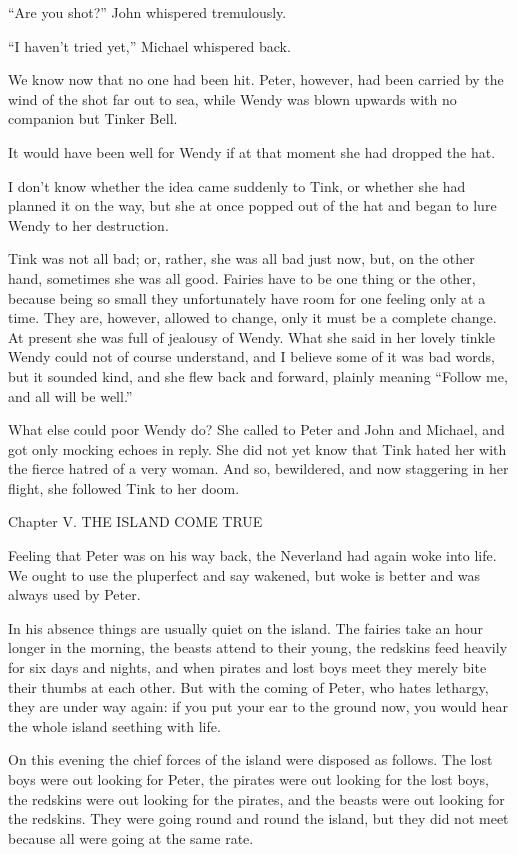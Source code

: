 ``Are you shot?'' John whispered tremulously.

``I haven't tried yet,'' Michael whispered back.

We know now that no one had been hit. Peter, however, had been carried
by the wind of the shot far out to sea, while Wendy was blown upwards
with no companion but Tinker Bell.

It would have been well for Wendy if at that moment she had dropped the
hat.

I don't know whether the idea came suddenly to Tink, or whether she had
planned it on the way, but she at once popped out of the hat and began
to lure Wendy to her destruction.

Tink was not all bad; or, rather, she was all bad just now, but, on the
other hand, sometimes she was all good. Fairies have to be one thing or
the other, because being so small they unfortunately have room for one
feeling only at a time. They are, however, allowed to change, only it
must be a complete change. At present she was full of jealousy of
Wendy. What she said in her lovely tinkle Wendy could not of course
understand, and I believe some of it was bad words, but it sounded
kind, and she flew back and forward, plainly meaning ``Follow me, and
all will be well.''

What else could poor Wendy do? She called to Peter and John and
Michael, and got only mocking echoes in reply. She did not yet know
that Tink hated her with the fierce hatred of a very woman. And so,
bewildered, and now staggering in her flight, she followed Tink to her
doom.




Chapter V.
THE ISLAND COME TRUE


Feeling that Peter was on his way back, the Neverland had again woke
into life. We ought to use the pluperfect and say wakened, but woke is
better and was always used by Peter.

In his absence things are usually quiet on the island. The fairies take
an hour longer in the morning, the beasts attend to their young, the
redskins feed heavily for six days and nights, and when pirates and
lost boys meet they merely bite their thumbs at each other. But with
the coming of Peter, who hates lethargy, they are under way again: if
you put your ear to the ground now, you would hear the whole island
seething with life.

On this evening the chief forces of the island were disposed as
follows. The lost boys were out looking for Peter, the pirates were out
looking for the lost boys, the redskins were out looking for the
pirates, and the beasts were out looking for the redskins. They were
going round and round the island, but they did not meet because all
were going at the same rate.

